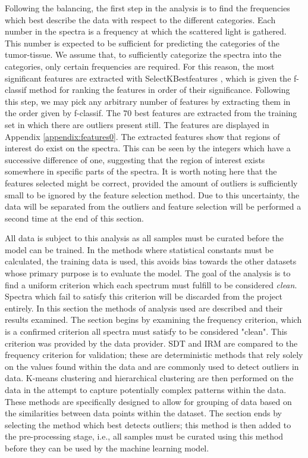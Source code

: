 Following the balancing, the first step in the analysis is to find the frequencies which best describe the data with respect to the different categories. Each number in the spectra is a frequency at which the scattered light is gathered. This number is expected to be sufficient for predicting the categories of the tumor-tissue. We assume that, to sufficiently categorize the spectra into the categories, only certain frequencies are required. For this reason, the most significant features are extracted with SelectKBestfeatures \cite{scikit}, which is given the f-classif method for ranking the features in order of their significance. Following this step, we may pick any arbitrary number of features by extracting them in the order given by f-classif. The $70$ best features are extracted from the training set in which there are outliers present still. The features are displayed in Appendix \ref{appendix:features0}. The extracted features show that regions of interest do exist on the spectra. This can be seen by the integers which have a successive difference of one, suggesting that the region of interest exists somewhere in specific parts of the spectra. It is worth noting here that the features selected might be correct, provided the amount of outliers is sufficiently small to be ignored by the feature selection method. Due to this uncertainty, the data will be separated from the outliers and feature selection will be performed a second time at the end of this section.

All data is subject to this analysis as all samples must be curated before the model can be trained. In the methods where statistical constants must be calculated, the training data is used, this avoids bias towards the other datasets whose primary purpose is to evaluate the model. The goal of the analysis is to find a uniform criterion which each spectrum must fulfill to be considered \textit{clean}. Spectra which fail to satisfy this criterion will be discarded from the project entirely. In this section the methods of analysis used are described and their results examined. The section begins by examining the frequency criterion, which is a confirmed criterion all spectra must satisfy to be considered "clean". This criterion was provided by the data provider. SDT and IRM are compared to the frequency criterion for validation; these are deterministic methods that rely solely on the values found within the data and are commonly used to detect outliers in data. K-means clustering and hierarchical clustering are then performed on the data in the attempt to capture potentially complex patterns within the data. These methods are specifically designed to allow for grouping of data based on the similarities between data points within the dataset. The section ends by selecting the method which best detects outliers; this method is then added to the pre-processing stage, i.e., all samples must be curated using this method before they can be used by the machine learning model. 

